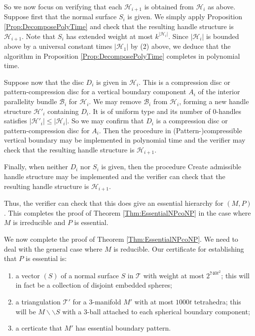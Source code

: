 \documentclass[oneside]{amsart}
\numberwithin{equation}{section}
\theoremstyle{plain}
\theoremstyle{definition}
\newcommand{\cut}{\backslash\backslash}
\newcommand{\calH}{\mathcal{H}}
\begin{document}
So we now focus on verifying that each $\mathcal{H}_{i+1}$ is obtained from $\mathcal{H}_i$ as above. Suppose first that the normal surface $S_i$ is given. We simply apply Proposition  \ref{Prop:DecomposePolyTime} and check that the resulting handle structure is $\calH_{i+1}$. Note that $S_i$ has extended weight at most $k^{|\mathcal{H}_i|}$. Since $|\calH_i|$ is bounded above by a universal constant times $|\calH_1|$ by (2) above, we deduce that the algorithm in Proposition  \ref{Prop:DecomposePolyTime} completes in polynomial time.

Suppose now that the disc $D_i$ is given in $\mathcal{H}_i$. This is a compression disc or pattern-compression disc for a vertical boundary component $A_i$ of the interior parallelity bundle $\mathcal{B}_i$ for $\mathcal{H}_i$. We may remove $\mathcal{B}_i$ from $\mathcal{H}_i$, forming a new handle structure $\mathcal{H}'_i$ containing $D_i$. It is of uniform type and its number of 0-handles satisfies
$|\mathcal{H}'_i| \leq |\mathcal{H}_i|$. So we may confirm that $D_i$ is a compression disc or pattern-compression disc for $A_i$. Then the procedure in {\sc (Pattern-)compressible vertical boundary} may be implemented in polynomial time and the verifier may check that the resulting handle structure is $\mathcal{H}_{i+1}$. 

Finally, when neither $D_i$ nor $S_i$ is given, then the procedure {\sc Create admissible handle structure} may be implemented and the verifier can check that the resulting handle structure is $\mathcal{H}_{i+1}$.

Thus, the verifier can check that this does give an essential hierarchy for $(M,P)$. This completes the proof of Theorem \ref{Thm:EssentialNPcoNP} in the case where $M$ is irreducible and $P$ is essential.

We now complete the proof of Theorem \ref{Thm:EssentialNPcoNP}. We need to deal with the general case where $M$ is reducible. Our certificate for establishing that $P$ is essential is:
\begin{enumerate}
\item a vector $(S)$ of a normal surface $S$ in $\mathcal{T}$ with weight at most $2^{740t^2}$; this will in fact be a collection of disjoint embedded spheres;
\item a triangulation $\mathcal{T}'$ for a 3-manifold $M'$ with at most $1000t$ tetrahedra; this will be $M \cut S$ with a 3-ball attached to each spherical boundary component;
\item a certicate that $M'$ has essential boundary pattern.\end{enumerate}
\end{document}
